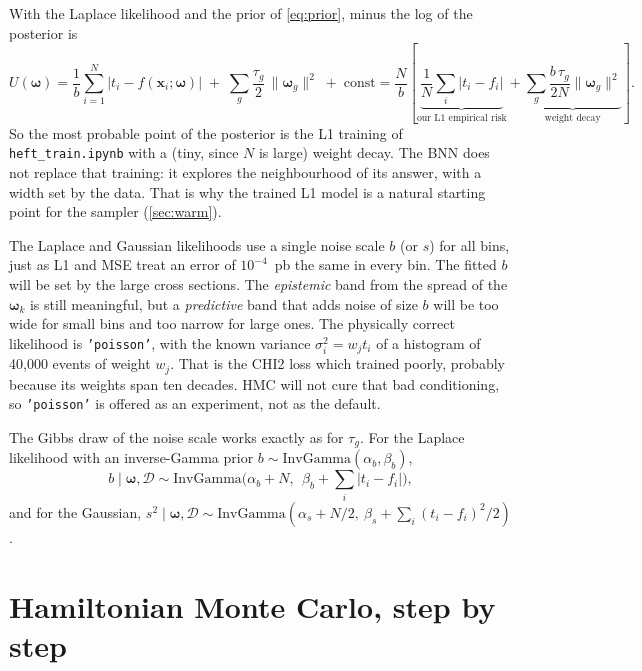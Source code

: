 \documentclass[11pt]{article}
\newcommand{\file}[1]{\nolinkurl{#1}}
\newcommand{\code}[1]{\texttt{#1}}
\newcommand{\bw}{\boldsymbol{\omega}}
\newcommand{\bx}{\boldsymbol{x}}
\newcommand{\data}{\mathcal{D}}
\begin{document}
\begin{keyidea}
With the Laplace likelihood and the prior of \cref{eq:prior}, minus the log of the
posterior is
\[
  U(\bw) = \frac{1}{b} \sum_{i=1}^{N} \lvert t_i - f(\bx_i;\bw)\rvert
  \;+\; \sum_{g} \frac{\tau_g}{2}\, \lVert \bw_g \rVert^2 \;+\; \text{const}
  = \frac{N}{b}\left[ \underbrace{\frac{1}{N}\sum_i \lvert t_i - f_i\rvert}_{\text{our L1 empirical risk}}
  + \underbrace{\sum_g \frac{b\,\tau_g}{2N} \lVert\bw_g\rVert^2}_{\text{weight decay}} \right].
\]
So the most probable point of the posterior is the L1 training of
\file{heft_train.ipynb} with a (tiny, since $N$ is large) weight decay. The BNN
does not replace that training: it explores the neighbourhood of its answer, with
a width set by the data. That is why the trained L1 model is a natural starting
point for the sampler (\cref{sec:warm}).
\end{keyidea}

\begin{watch}
The Laplace and Gaussian likelihoods use a single noise scale $b$ (or $s$) for all
bins, just as L1 and MSE treat an error of $10^{-4}$~pb the same in every bin. The
fitted $b$ will be set by the large cross sections. The \emph{epistemic} band from
the spread of the $\bw_k$ is still meaningful, but a \emph{predictive} band that
adds noise of size $b$ will be too wide for small bins and too narrow for large
ones. The physically correct likelihood is \code{'poisson'}, with the known
variance $\sigma_i^2 = w_j t_i$ of a histogram of 40,000 events of weight $w_j$.
That is the CHI2 loss which trained poorly, probably because its weights span ten
decades. HMC will not cure that bad conditioning, so \code{'poisson'} is offered as
an experiment, not as the default.
\end{watch}

\noindent The Gibbs draw of the noise scale works exactly as for $\tau_g$. For the
Laplace likelihood with an inverse-Gamma prior $b \sim \text{InvGamma}(\alpha_b, \beta_b)$,
\[
  b \mid \bw, \data \sim \text{InvGamma}\Big(\alpha_b + N,\ \ \beta_b + \sum_i \lvert t_i - f_i\rvert\Big),
\]
and for the Gaussian, $s^2 \mid \bw, \data \sim \text{InvGamma}(\alpha_s + N/2,\ \beta_s + \sum_i (t_i - f_i)^2/2)$.

\section{Hamiltonian Monte Carlo, step by step}
\label{sec:hmc}
\end{document}
